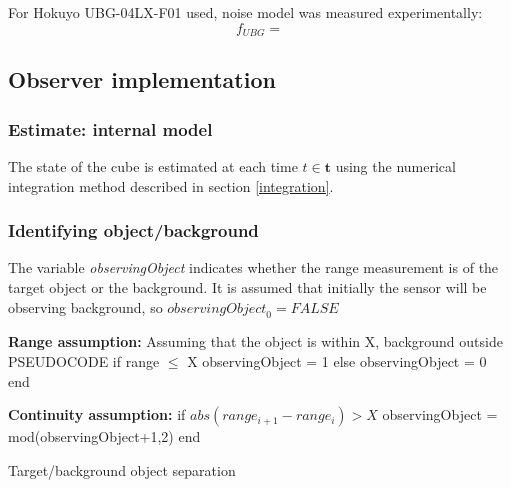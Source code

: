 	For Hokuyo UBG-04LX-F01 used, noise model was measured experimentally:
	\begin{equation}
		f_{UBG} = 
	\end{equation}
	
	
\subsection{Observer implementation}
	\subsubsection{Estimate: internal model}
		The state of the cube is estimated at each time $t \in \mathbf{t}$ using the numerical integration method described in section \ref{integration}.
	
	\subsubsection{Identifying object/background}
		The variable \textit{observingObject} indicates whether the range measurement is of the target object or the background. It is assumed that initially the sensor will be observing background, so $\textit{observingObject}_0 = FALSE$

		\textbf{Range assumption:}
		Assuming that the object is within X, background outside
		PSEUDOCODE
		if range $\leq$ X
			observingObject = 1
		else
			observingObject = 0
		end
		
		\textbf{Continuity assumption:}
		if $abs(range_{i+1}-range_i) > X$
			observingObject = mod(observingObject+1,2)
		end
		
		\IncMargin{2em}
		\begin{algorithm}
		\DontPrintSemicolon
	
		\caption{Target/background object separation}
		\end{algorithm}
		
